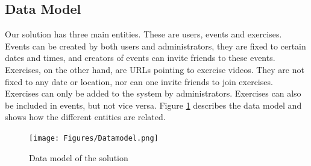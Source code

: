 \subsection{Data Model}
Our solution has three main entities. These are users, events and exercises. Events can be created by both users and administrators, they are fixed to certain dates and times, and creators of events can invite friends to these events. Exercises, on the other hand, are URLs pointing to exercise videos. They are not fixed to any date or location, nor can one invite friends to join exercises. Exercises can only be added to the system by administrators. Exercises can also be included in events, but not vice versa. Figure \ref{fig:dataModel} describes the data model and shows how the different entities are related.
\begin{figure}[H]
\centering
\texttt{[image: Figures/Datamodel.png]}
\caption{Data model of the solution}
\label{fig:dataModel}
\end{figure}

